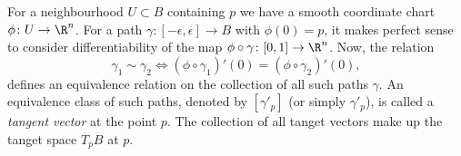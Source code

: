 For a neighbourhood $U \subset B$ containing $p$ we have a smooth coordinate
chart $\phi\colon U \rightarrow \R^n$. For a path $\gamma \colon
[-\epsilon,\epsilon] \rightarrow B$ with $\phi(0) = p$, it makes perfect sense to consider
differentiability of the map $\phi \circ \gamma \colon
[0,1]\rightarrow \R^n$. Now, the relation
\begin{equation*}
  \gamma_1 \sim \gamma_2 \iff
  (\phi \circ \gamma_1)'(0) = (\phi \circ \gamma_2)'(0),
\end{equation*}
defines an equivalence relation on the collection of all such paths
$\gamma$. An equivalence class of such paths, denoted by $[\gamma'_p]$ (or simply
$\gamma'_p$), is called a \textit{tangent vector}
at the point $p$. The collection of all tanget vectors make up the
tanget space $T_pB$ at $p$.
